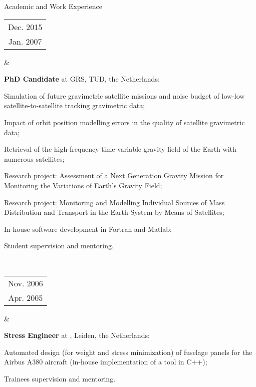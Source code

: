 \documentclass[a4paper,9pt]{article}
\newcommand{\dynhref}[2]{%
  \iftoggle{expliciturl}{%
    #2 \footnote{\href{http://#1}{\detokenize{#1}}}%
  }{%
    \href{http://#1}{#2}%
  }%
}
\begin{document}
\begin{cvsection}{Academic and Work Experience}
  \begin{tabular}{c}
  Dec. 2015 \\
  Jan. 2007 \\ 
  \end{tabular} 
  &
  \begin{itti}
    \item \textbf{PhD Candidate} at \ac{GRS}, \ac{TUD}, the Netherlands:
    \begin{ittib}
      \item Simulation of future gravimetric satellite missions and noise budget of low-low satellite-to-satellite tracking gravimetric data;
      \item Impact of orbit position modelling errors in the quality of satellite gravimetric data;
      \item Retrieval of the high-frequency time-variable gravity field of the Earth with numerous satellites;
      \item Research project: Assessment of a Next Generation Gravity Mission for Monitoring the Variations of Earth's Gravity Field;
      \item Research project: Monitoring and Modelling Individual Sources of Mass Distribution and Transport in the Earth System by Means of Satellites;
      \item In-house software development in Fortran and Matlab;
      \item Student supervision and mentoring.
    \end{ittib}
  \end{itti}\\

  \begin{tabular}{c}
  Nov. 2006 \\
  Apr. 2005 \\ 
  \end{tabular} 
  &
  \begin{itti}
    \item \textbf{Stress Engineer} at \dynhref{www.globaltechnics.nl/}{Global Technics}, Leiden, the Netherlands:
    \begin{ittib}
      \item Automated design (for weight and stress minimization) of fuselage panels for the Airbus A380 aircraft (in-house implementation of a tool in C++);
      \item Trainees supervision and mentoring.
    \end{ittib}
  \end{itti}\\


\end{cvsection}
\end{document}
